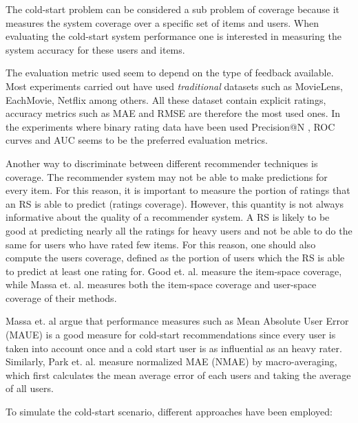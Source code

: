 The cold-start problem can be considered a sub problem of coverage because it measures the system coverage over a specific set of items and users. When evaluating the cold-start system performance one is interested in measuring the system accuracy for these users and items.

The evaluation metric used seem to depend on the type of feedback available. Most experiments carried out have used \emph{traditional} datasets such as MovieLens, EachMovie, Netflix among others. All these dataset contain explicit ratings, accuracy metrics such as MAE \cite{Rashid2002, Rashid 2008, Massa2004, Massa2007, Stern2009} and RMSE \cite{Agarwal2009, Agarwal2010} are therefore the most used ones. In the experiments where binary rating data have been used Precision@N \cite{Liu2011, Ganter2010}, ROC curves \cite{Agarwal2009, Ganter2010, Schein2002} and AUC \cite{Liu2011, Ganter2010} seems to be the preferred evaluation metrics.

Another way to discriminate between different recommender techniques is coverage. The recommender system may not be able to make predictions for every item. For this reason, it is important to measure the portion of ratings that an RS is able to predict (ratings coverage). However, this quantity is not always informative about the quality of a recommender system. A RS is likely to be good at predicting nearly all the ratings for heavy users and not be able to do the same for users who have rated few items. For this reason, one should also compute the users coverage, defined as the portion of users which the RS is able to predict at least one rating for. Good et. al. \cite{Good1999} measure the item-space coverage, while Massa et. al. \cite{Massa2004, Massa2007} measures both the item-space coverage and user-space coverage of their methods.
 
Massa et. al \cite{Massa2004} argue that performance measures such as Mean Absolute User Error (MAUE) is a good measure for cold-start recommendations since every user is taken into account once and a cold start user is as influential as an heavy rater. Similarly, Park et. al. \cite{Park2006} measure normalized MAE (NMAE) by macro-averaging, which first calculates the mean average error of each users and taking the average of all users.

To simulate the cold-start scenario, different approaches have been employed:

